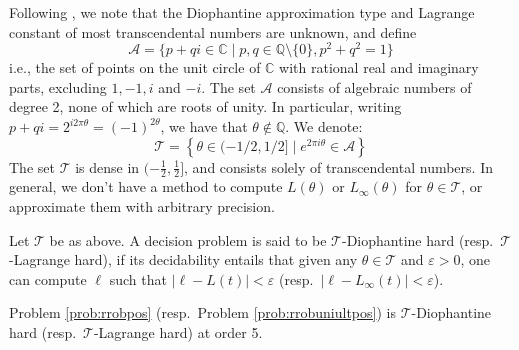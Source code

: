 Following \cite{joeljames3}, we note that the Diophantine approximation type and Lagrange constant of most transcendental numbers are unknown, and define
\begin{equation}
\mathcal A=\{p+q i \in \mathbb{C} \mid p,q \in \mathbb{Q} \setminus \{0\}, p^2+q^2=1\}
\end{equation}
i.e., the set of points on the unit circle of $\mathbb{C}$ with rational real and imaginary parts, excluding $1,-1, i$ and $-i$. The set $\mathcal A$ consists of algebraic numbers of degree 2, none of which are roots of unity. In particular, writing $p+q i= 2^{i 2 \pi \theta}=(-1)^{2\theta}$, we have that $\theta \notin \mathbb{Q}$. We denote:
\begin{equation}
\label{eq:keyset}
\mathcal{T} = \left\{ \theta \in (- 1/2, 1/2] \mid e^{2 \pi i \theta} \in \mathcal{A}\right\}
\end{equation}
The set $\mathcal{T}$ is dense in $(- \frac 1 2, \frac 1 2]$, and consists solely of transcendental numbers. In general, we don't have a method to compute $L(\theta)$ or $L_\infty(\theta)$ for $\theta \in \mathcal{T}$, or approximate them with arbitrary precision.

\begin{definition}
\label{def:hardness}
Let $\mathcal{T}$ be as above. A decision problem is said to be $\mathcal{T}$-Diophantine hard (resp.\ $\mathcal{T}$-Lagrange hard), if its decidability entails that given any $\theta \in \mathcal{T}$ and $\varepsilon > 0$, one can compute $\ell$ such that $|\ell - L(t)| < \varepsilon$ (resp.\  $|\ell - L_\infty(t)| < \varepsilon$).
\end{definition}

\begin{theorem}
\label{thm:hardness}
Problem \ref{prob:rrobpos} (resp.\ Problem \ref{prob:rrobuniultpos}) is $\mathcal{T}$-Diophantine hard (resp.\ $\mathcal{T}$-Lagrange hard) at order 5. 
\end{theorem}